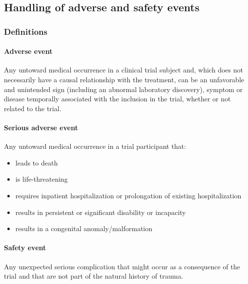 \documentclass[
]{scrartcl}
\let\oldparagraph\paragraph
\renewcommand{\paragraph}[1]{\oldparagraph{#1}\mbox{}}
\providecommand{\tightlist}{%
  \setlength{\itemsep}{0pt}\setlength{\parskip}{0pt}}\usepackage{longtable,booktabs,array}
\begin{document}
\hypertarget{handling-of-adverse-and-safety-events}{%
\subsection{Handling of adverse and safety
events}\label{handling-of-adverse-and-safety-events}}

\hypertarget{definitions}{%
\subsubsection{Definitions}\label{definitions}}

\hypertarget{adverse-event}{%
\paragraph{Adverse event}\label{adverse-event}}

Any untoward medical occurrence in a clinical trial subject and, which
does not necessarily have a causal relationship with the treatment, can
be an unfavorable and unintended sign (including an abnormal laboratory
discovery), symptom or disease temporally associated with the inclusion
in the trial, whether or not related to the trial.

\hypertarget{serious-adverse-event}{%
\paragraph{Serious adverse event}\label{serious-adverse-event}}

Any untoward medical occurrence in a trial participant that:

\begin{itemize}
\tightlist
\item
  leads to death
\item
  is life-threatening
\item
  requires inpatient hospitalization or prolongation of existing
  hospitalization
\item
  results in persistent or significant disability or incapacity
\item
  results in a congenital anomaly/malformation
\end{itemize}

\hypertarget{safety-event}{%
\paragraph{Safety event}\label{safety-event}}

Any unexpected serious complication that might occur as a consequence of
the trial and that are not part of the natural history of trauma.
\end{document}
